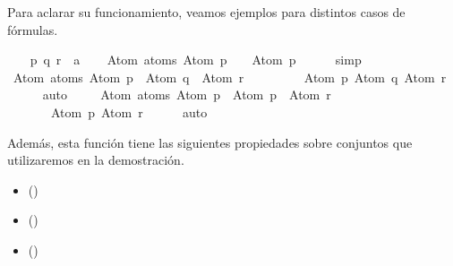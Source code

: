 \begin{isabellebody}
\begin{isamarkuptext}
  Para aclarar su funcionamiento, veamos ejemplos para distintos casos 
  de fórmulas.%
\end{isamarkuptext}\isamarkuptrue%
\isamarkupfalse%
\isanewline
{}\isanewline
%
\isadelimproof
\ \ %
\endisadelimproof
%
\isatagproof
{}\isamarkupfalse%
\ p\ q\ r\ {\isacharcolon}{\isacharcolon}\ {\isacharprime}a\isanewline
\isanewline
\ \ \isamarkupfalse%
\ {\isachardoublequoteopen}Atom\ {\isacharbackquote}atoms\ {\isacharparenleft}Atom\ p\ \isactrlbold {\isasymor}\ {\isasymbottom}{\isacharparenright}\ {\isacharequal}\ {\isacharbraceleft}Atom\ p{\isacharbraceright}{\isachardoublequoteclose}\isanewline
\ \ \ \ \isamarkupfalse%
\ simp\isanewline
\isanewline
\ \ \isamarkupfalse%
\ {\isachardoublequoteopen}Atom\ {\isacharbackquote}atoms\ {\isacharparenleft}{\isacharparenleft}Atom\ p\ \isactrlbold {\isasymrightarrow}\ Atom\ q{\isacharparenright}\ \isactrlbold {\isasymor}\ Atom\ r{\isacharparenright}\ {\isacharequal}\ \isanewline
\ \ \ \ \ \ \ {\isacharbraceleft}Atom\ p{\isacharcomma}\ Atom\ q{\isacharcomma}\ Atom\ r{\isacharbraceright}{\isachardoublequoteclose}\isanewline
\ \ \ \ \isamarkupfalse%
\ auto\ \isanewline
\isanewline
\ \ \isamarkupfalse%
\ {\isachardoublequoteopen}Atom\ {\isacharbackquote}atoms\ {\isacharparenleft}{\isacharparenleft}Atom\ p\ \isactrlbold {\isasymrightarrow}\ Atom\ p{\isacharparenright}\ \isactrlbold {\isasymor}\ Atom\ r{\isacharparenright}\ {\isacharequal}\ \isanewline
\ \ \ \ \ \ \ {\isacharbraceleft}Atom\ p{\isacharcomma}\ Atom\ r{\isacharbraceright}{\isachardoublequoteclose}\isanewline
\ \ \ \ \isamarkupfalse%
\ auto%
\endisatagproof
{\isafoldproof}%
%
\isadelimproof
\isanewline
%
\endisadelimproof
{}\isamarkupfalse%
%
\begin{isamarkuptext}%
Además, esta función tiene las siguientes propiedades sobre 
  conjuntos que utilizaremos en la demostración.

  \begin{itemize}
    \item[]  
      \hfill ()
    \item[]  
      \hfill ()
    \item[]  
      \hfill ()
  \end{itemize}


\end{isamarkuptext}
\end{isabellebody}
